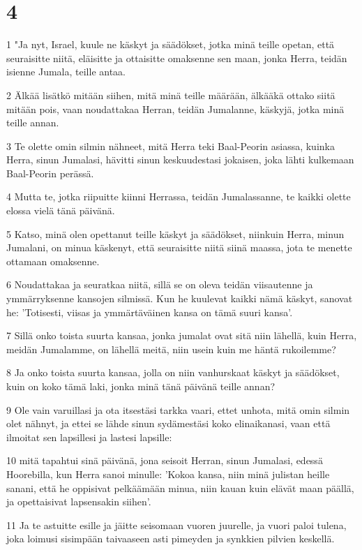 \chapter{4}

\par 1 "Ja nyt, Israel, kuule ne käskyt ja säädökset, jotka minä teille opetan, että seuraisitte niitä, eläisitte ja ottaisitte omaksenne sen maan, jonka Herra, teidän isienne Jumala, teille antaa.
\par 2 Älkää lisätkö mitään siihen, mitä minä teille määrään, älkääkä ottako siitä mitään pois, vaan noudattakaa Herran, teidän Jumalanne, käskyjä, jotka minä teille annan.
\par 3 Te olette omin silmin nähneet, mitä Herra teki Baal-Peorin asiassa, kuinka Herra, sinun Jumalasi, hävitti sinun keskuudestasi jokaisen, joka lähti kulkemaan Baal-Peorin perässä.
\par 4 Mutta te, jotka riipuitte kiinni Herrassa, teidän Jumalassanne, te kaikki olette elossa vielä tänä päivänä.
\par 5 Katso, minä olen opettanut teille käskyt ja säädökset, niinkuin Herra, minun Jumalani, on minua käskenyt, että seuraisitte niitä siinä maassa, jota te menette ottamaan omaksenne.
\par 6 Noudattakaa ja seuratkaa niitä, sillä se on oleva teidän viisautenne ja ymmärryksenne kansojen silmissä. Kun he kuulevat kaikki nämä käskyt, sanovat he: 'Totisesti, viisas ja ymmärtäväinen kansa on tämä suuri kansa'.
\par 7 Sillä onko toista suurta kansaa, jonka jumalat ovat sitä niin lähellä, kuin Herra, meidän Jumalamme, on lähellä meitä, niin usein kuin me häntä rukoilemme?
\par 8 Ja onko toista suurta kansaa, jolla on niin vanhurskaat käskyt ja säädökset, kuin on koko tämä laki, jonka minä tänä päivänä teille annan?
\par 9 Ole vain varuillasi ja ota itsestäsi tarkka vaari, ettet unhota, mitä omin silmin olet nähnyt, ja ettei se lähde sinun sydämestäsi koko elinaikanasi, vaan että ilmoitat sen lapsillesi ja lastesi lapsille:
\par 10 mitä tapahtui sinä päivänä, jona seisoit Herran, sinun Jumalasi, edessä Hoorebilla, kun Herra sanoi minulle: 'Kokoa kansa, niin minä julistan heille sanani, että he oppisivat pelkäämään minua, niin kauan kuin elävät maan päällä, ja opettaisivat lapsensakin siihen'.
\par 11 Ja te astuitte esille ja jäitte seisomaan vuoren juurelle, ja vuori paloi tulena, joka loimusi sisimpään taivaaseen asti pimeyden ja synkkien pilvien keskellä.
